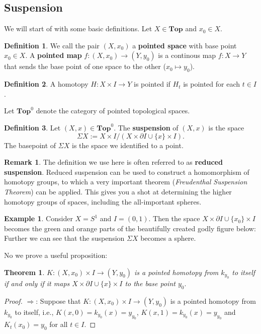 \documentclass{article}
\newtheorem{theorem}{Theorem}[section]
\theoremstyle{definition}
\newtheorem{ex}{Example}[section]
\newtheorem{remark}{Remark}
\newtheorem{defn}{Definition}[section]
\newcommand{\cat}[1]{\mathbf{#1}}
\begin{document}
\subsection{Suspension} We will start of with some basic definitions. Let $X\in \cat{Top}$ and $x_0\in X$. \begin{defn}
We call the pair $(X,x_0)$ a \textbf{pointed space} with base point $x_0\in X$. A \textbf{pointed map} $f:(X,x_0)\rightarrow (Y,y_0)$ is a continous map $f:X \rightarrow Y$ that sends the base point of one space to the other ($x_0 \mapsto y_0$).
\end{defn} 
\begin{defn}
A homotopy $H:X\times I \rightarrow Y$ is pointed if $H_t$ is pointed for each $t\in I$.
\end{defn}
Let $\cat{Top}^{0}$ denote the category of pointed topological spaces. 
\begin{defn} Let $(X,x)\in\cat{Top}^{0}$. The \textbf{suspension} of $(X,x)$ is the space \[\Sigma X:=X\times I/(X\times\partial I\cup\{x\}\times I).\] The basepoint of $\Sigma X$ is the space we identified to a point. 
\end{defn}
\begin{remark}
The definition we use here is often referred to as \textbf{reduced suspension}. Reduced suspension can be used to construct a homomorphism of homotopy groups, to which a very important theorem (\textit{Freudenthal Suspension Theorem}) can be applied. This gives you a shot at determining the higher homotopy groups of spaces, including the all-important spheres.
\end{remark}
\begin{ex}
Consider $X=S^1$ and $I=(0,1)$. Then the space $X\times\partial I\cup\{x_0\}\times I$ becomes the green and orange parts of the beautifully created godly figure below:
Further we can see that the suspension $\Sigma X$ becomes a sphere.
\end{ex}
No we prove a useful proposition:
\begin{theorem}
$K:(X,x_{0})\times I\rightarrow (Y,y_{0})$ is a pointed homotopy from $k_{y_{0}}$ to itself if and only if it maps $X\times\partial I\cup\{x\}\times I$ to the base point $y_{0}.$
\end{theorem}
\begin{proof}
$\Rightarrow$: Suppose that $K:(X,x_{0})\times I\rightarrow (Y,y_{0})$ is a pointed homotopy from $k_{y_{0}}$ to itself, i.e., $K(x,0)=k_{y_0}(x)=y_{y_0}$, $K(x,1)=k_{y_0}(x)=y_{y_0}$ and $K_t(x_0)=y_0$ for all $t\in I$.  
\end{proof}
\end{document}
